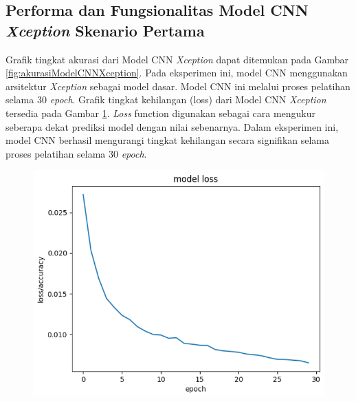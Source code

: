 \subsection*{Performa dan Fungsionalitas Model CNN \textit{Xception} Skenario Pertama}

Grafik tingkat akurasi dari Model CNN \textit{Xception} dapat ditemukan pada Gambar \ref{fig:akurasiModelCNNXception}. Pada eksperimen ini, model CNN menggunakan arsitektur \textit{Xception} sebagai model dasar. Model CNN ini melalui proses pelatihan selama 30\textit{ epoch}. Grafik tingkat kehilangan (loss) dari Model CNN \textit{Xception} tersedia pada Gambar \ref{fig:lossModelCNNXception}. \textit{Loss} function digunakan sebagai cara mengukur seberapa dekat prediksi model dengan nilai sebenarnya. Dalam eksperimen ini, model CNN berhasil mengurangi tingkat kehilangan secara signifikan selama proses pelatihan selama 30\textit{ epoch}.

\begin{figure}[!hbt]
	\centering
	\includegraphics[width=0.7\linewidth]{gambar/bener/Loss_ModelXception.png}
	\label{fig:lossModelCNNXception}
\end{figure}

